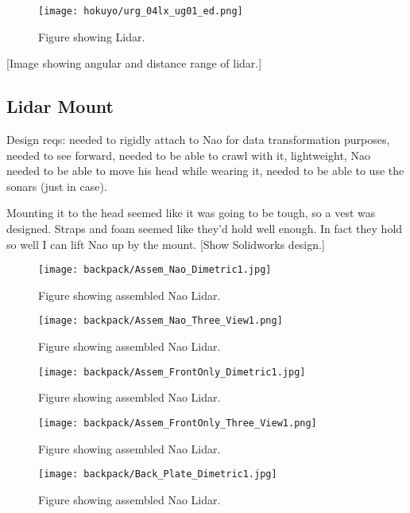 \begin{figure}
\centering
\texttt{[image: hokuyo/urg\_04lx\_ug01\_ed.png]}
\caption{Figure showing Lidar.}
\label{fig:lidar_diagram1}
\end{figure}

[Image showing angular and distance range of lidar.]



\subsection{Lidar Mount}
Design reqs: needed to rigidly attach to Nao for data transformation purposes, needed to see forward,
needed to be able to crawl with it, lightweight, Nao needed to be able to move his head while wearing it,
needed to be able to use the sonars (just in case).

Mounting it to the head seemed like it was going to be tough, so a vest was designed.
Straps and foam seemed like they'd hold well enough. In fact they hold so well I can lift Nao up by the mount.
[Show Solidworks design.]
\begin{figure}
\centering
\texttt{[image: backpack/Assem\_Nao\_Dimetric1.jpg]}
\caption{Figure showing assembled Nao Lidar.}
\label{fig:nao_lidar_mount_nao_dimetric1}
\end{figure}

\begin{figure}
\centering
\texttt{[image: backpack/Assem\_Nao\_Three\_View1.png]}
\caption{Figure showing assembled Nao Lidar.}
\label{fig:nao_lidar_mount_nao_three_view1}
\end{figure}

\begin{figure}
\centering
\texttt{[image: backpack/Assem\_FrontOnly\_Dimetric1.jpg]}
\caption{Figure showing assembled Nao Lidar.}
\label{fig:nao_lidar_mount_dimetric1}
\end{figure}

\begin{figure}
\centering
\texttt{[image: backpack/Assem\_FrontOnly\_Three\_View1.png]}
\caption{Figure showing assembled Nao Lidar.}
\label{fig:nao_lidar_mount_three_view1}
\end{figure}

\begin{figure}
\centering
\texttt{[image: backpack/Back\_Plate\_Dimetric1.jpg]}
\caption{Figure showing assembled Nao Lidar.}
\label{fig:nao_lidar_mount_backplate_dimetric1}
\end{figure}

